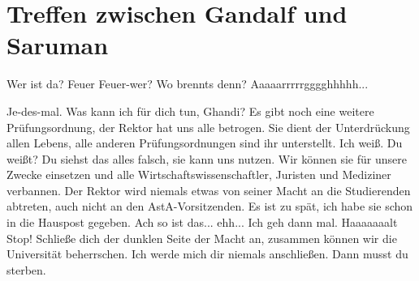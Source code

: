 \newpage
\section{Treffen zwischen Gandalf und Saruman}
\label{sec:gandalf-saruman}
\charaktere{\Gandalf, \Saruman, \Tuermonteura, \Tuermonteurb}
\hauptbeamer{-}
\begin{verseplay}[7em]
\s{\Saruman} Wer ist da?
\s{\Gandalf} Feuer
\s{\Saruman} Feuer-wer?
\s{\Gandalf}  Wo brennts denn?
\s{\Saruman} Aaaaarrrrrgggghhhhh... 
\end{verseplay}
\begin{verseplay}[7em]
\s{\Saruman} Je-des-mal. Was kann ich für dich tun, Ghandi?
\s{\Gandalf} Es gibt noch eine weitere Prüfungsordnung, der Rektor hat uns alle betrogen. Sie dient der Unterdrückung allen Lebens, alle anderen Prüfungsordnungen sind ihr unterstellt.
\s{\Saruman} Ich weiß.
\s{\Gandalf}  Du weißt?
\s{\Saruman} Du siehst das alles falsch, sie kann uns nutzen. Wir können sie für unsere Zwecke einsetzen und alle Wirtschaftswissenschaftler, Juristen und Mediziner verbannen.
\s{\Gandalf} Der Rektor wird niemals etwas von seiner Macht an die Studierenden abtreten, auch nicht an den AstA-Vorsitzenden.
\s{\Saruman} Es ist zu spät, ich habe sie schon in die Hauspost gegeben.
\s{\Gandalf} Ach so ist das... ehh... Ich geh dann mal.
\s{\Saruman} Haaaaaaalt Stop! Schließe dich der dunklen Seite der Macht an, zusammen können wir die Universität beherrschen.
\s{\Gandalf} Ich werde mich dir niemals anschließen.
\s{\Saruman} Dann musst du sterben.
\end{verseplay}

